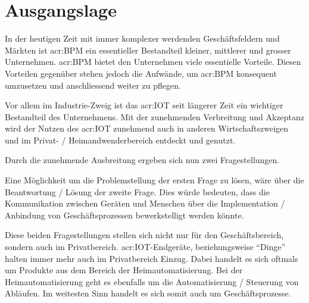 
\chapter{Ausgangslage}

In der heutigen Zeit mit immer komplexer werdenden Geschäftsfeldern und Märkten ist \gls{acr:BPM} ein essentieller Bestandteil kleiner, mittlerer und grosser Unternehmen. \gls{acr:BPM} bietet den Unternehmen viele essentielle Vorteile. Diesen Vorteilen gegenüber stehen jedoch die Aufwände, um \gls{acr:BPM} konsequent umzusetzen und anschliessend weiter zu pflegen.

Vor allem im Industrie-Zweig ist das \gls{acr:IOT} seit längerer Zeit ein wichtiger Bestandteil des Unternehmens. Mit der zunehmenden Verbreitung und Akzeptanz wird der Nutzen des \gls{acr:IOT} zunehmend auch in anderen Wirtschaftszweigen und im Privat- / Heimandwenderbereich entdeckt und genutzt.

Durch die zunehmende Ausbreitung ergeben sich nun zwei Fragestellungen.

\begin{itemize}
\end{itemize}
\newpage
Eine Möglichkeit um die Problemstellung der ersten Frage zu lösen, wäre über die Beantwortung / Lösung der zweite Frage. Dies würde bedeuten, dass die Kommunikation zwischen Geräten und Menschen über die Implementation / Anbindung von Geschäftsprozessen bewerkstelligt werden könnte.

Diese beiden Fragestellungen stellen sich nicht nur für den Geschäftsbereich, sondern auch im Privatbereich. \gls{acr:IOT}-Endgeräte, beziehungsweise "`Dinge"' halten immer mehr auch im Privatbereich Einzug. Dabei handelt es sich oftmals um Produkte aus dem Bereich der Heimautomatisierung. Bei der Heimautomatisierung geht es ebenfalls um die Automatisierung / Steuerung von Abläufen. Im weitesten Sinn handelt es sich somit auch um Geschäftsprozesse.


